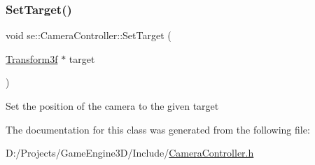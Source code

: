 \mbox{\label{classse_1_1_camera_controller_a7b9d137e927ce64aae6af3f21c64f1d5}} 
\subsubsection{\texorpdfstring{Set\+Target()}{SetTarget()}}
{\footnotesize\ttfamily void se\+::\+Camera\+Controller\+::\+Set\+Target (\begin{DoxyParamCaption}\item[{\mbox{\hyperlink{classse_1_1_transform3f}{Transform3f}} $\ast$}]{target }\end{DoxyParamCaption})}

Set the position of the camera to the given target 

The documentation for this class was generated from the following file\+:\begin{DoxyCompactItemize}
\item 
D\+:/\+Projects/\+Game\+Engine3\+D/\+Include/\mbox{\hyperlink{_camera_controller_8h}{Camera\+Controller.\+h}}\end{DoxyCompactItemize}
